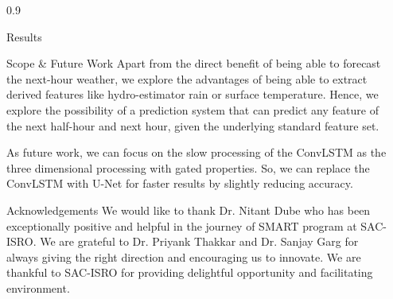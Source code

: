 \documentclass[final]{beamer}
\newlength{\sepwidth}
\newlength{\colwidth}
\newcommand{\separatorcolumn}{\begin{column}{\sepwidth}\end{column}}
\begin{document}
\begin{frame}[t]
\begin{columns}[t]
\begin{column}{0.9\colwidth}
\begin{block}{Results}
\end{block}
  
\begin{block}{Scope \& Future Work}
Apart from the direct benefit of being able to forecast the next-hour weather, we explore the advantages of being able to extract derived features like hydro-estimator rain or surface temperature. Hence, we explore the possibility of a prediction system that can predict any feature of the next half-hour and next hour, given the underlying standard feature set. 

As future work, we can focus on the slow processing of the ConvLSTM as the three dimensional processing with gated properties. So, we can replace the ConvLSTM with U-Net for faster results by slightly reducing accuracy. 

\end{block}

\begin{block}{Acknowledgements}
We would like to thank Dr. Nitant Dube who has been exceptionally positive and helpful in the journey of SMART program at SAC-ISRO. We are grateful to Dr. Priyank Thakkar and Dr. Sanjay Garg for always giving the right direction and encouraging us to innovate. We are thankful to SAC-ISRO for providing delightful opportunity and facilitating environment. 


\end{block}

\end{column}

\separatorcolumn
\end{columns}
\end{frame}
\end{document}
